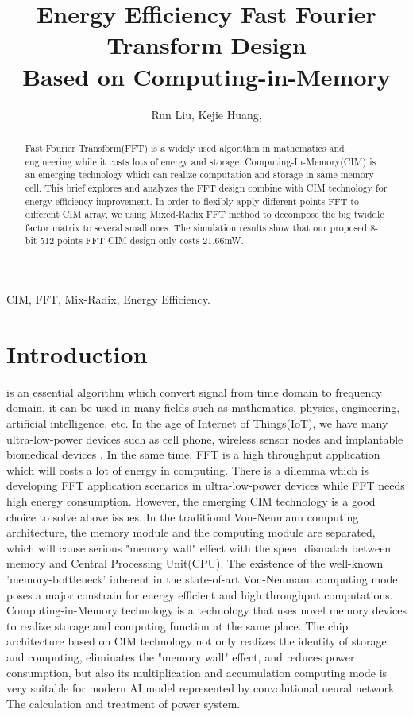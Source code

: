 \documentclass[journal]{IEEEtran}
\begin{document}
\title{Energy Efficiency Fast Fourier Transform Design \\ Based on Computing-in-Memory}
\author{Run Liu, 
        Kejie Huang, }

\maketitle
\begin{abstract}
Fast Fourier Transform(FFT) is a widely used algorithm in mathematics and engineering while it costs lots of energy and storage. Computing-In-Memory(CIM) is an emerging technology which can realize computation and storage in same memory cell. This brief explores and analyzes the FFT design combine with CIM technology for energy efficiency improvement. In order to flexibly apply different points FFT to different CIM array, we using Mixed-Radix FFT method to decompose the big twiddle factor matrix to several small ones. The simulation results show that our proposed 8-bit 512 points FFT-CIM design only costs 21.66mW.
\end{abstract}

\begin{IEEEkeywords}
CIM, FFT, Mix-Radix, Energy Efficiency.
\end{IEEEkeywords}


\section{Introduction}
 is an essential algorithm which convert signal from time domain to
frequency domain, it can be used in many fields such as mathematics, physics, engineering, artificial intelligence, etc. In the age of Internet of Things(IoT), we have many ultra-low-power devices such as cell phone, wireless sensor nodes and implantable biomedical devices \cite{1}. In the same time, FFT is a high throughput application which will costs a lot of energy in computing. There is a dilemma which is developing FFT application scenarios in ultra-low-power devices while FFT needs high energy consumption. However, the emerging CIM technology is a good choice to solve above issues. In the traditional Von-Neumann computing architecture, the memory module and the computing module are separated, which will cause serious\cite{2} "memory wall" effect with the speed dismatch between memory and Central Processing Unit(CPU). The existence of the well-known 'memory-bottleneck' inherent in the state-of-art Von-Neumann computing model poses a major constrain for energy efficient and high throughput computations. Computing-in-Memory technology is a technology that uses novel memory devices to realize storage and computing function at the same place. The chip architecture based on CIM technology not only realizes the identity of storage and computing, eliminates the "memory wall" effect, and reduces power consumption, but also its multiplication and accumulation computing mode is very suitable for modern AI model represented by convolutional neural network. The calculation and treatment of power system.
\end{document}
